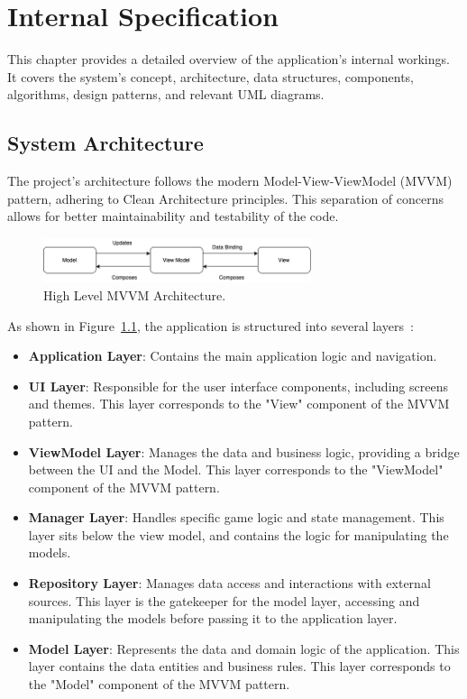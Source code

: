 \chapter{Internal Specification}
\label{chap:internal-specifications}

This chapter provides a detailed overview of the application's internal workings. It covers the system's concept, architecture, data structures, components, algorithms, design patterns, and relevant UML diagrams.

\section{System Architecture}

The project's architecture follows the modern Model-View-ViewModel (MVVM) pattern, adhering to Clean Architecture principles. This separation of concerns allows for better maintainability and testability of the code.

\begin{figure}[ht!]
    \centering
    \includegraphics[width=0.7\textwidth]{img/mvvm_explanation.png}
    \caption{High Level MVVM Architecture.}
    \label{fig:mvvm_explanation}
\end{figure}

As shown in Figure~\ref{fig:mvvm_explanation}, the application is structured into several layers~\cite{bib:mvvm}:

\begin{itemize}
    \item \textbf{Application Layer}: Contains the main application logic and navigation.
    \item \textbf{UI Layer}: Responsible for the user interface components, including screens and themes. This layer corresponds to the "View" component of the MVVM pattern.
    \item \textbf{ViewModel Layer}: Manages the data and business logic, providing a bridge between the UI and the Model. This layer corresponds to the "ViewModel" component of the MVVM pattern.
    \item \textbf{Manager Layer}: Handles specific game logic and state management. This layer sits below the view model, and contains the logic for manipulating the models.
    \item \textbf{Repository Layer}: Manages data access and interactions with external sources. This layer is the gatekeeper for the model layer, accessing and manipulating the models before passing it to the application layer.
    \item \textbf{Model Layer}: Represents the data and domain logic of the application. This layer contains the data entities and business rules. This layer corresponds to the "Model" component of the MVVM pattern.
\end{itemize}


